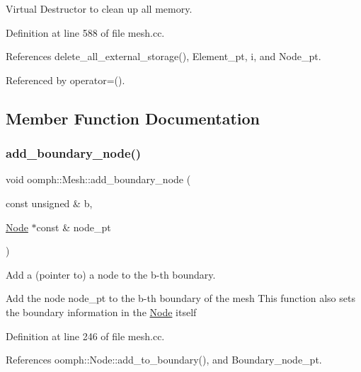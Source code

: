 Virtual Destructor to clean up all memory. 



Definition at line 588 of file mesh.\+cc.



References delete\+\_\+all\+\_\+external\+\_\+storage(), Element\+\_\+pt, i, and Node\+\_\+pt.



Referenced by operator=().



\subsection{Member Function Documentation}
\mbox{\label{classoomph_1_1Mesh_a007b102ac8e42328872ad658d7110bfc}} 
\subsubsection{\texorpdfstring{add\+\_\+boundary\+\_\+node()}{add\_boundary\_node()}}
{\footnotesize\ttfamily void oomph\+::\+Mesh\+::add\+\_\+boundary\+\_\+node (\begin{DoxyParamCaption}\item[{const unsigned \&}]{b,  }\item[{\hyperlink{classoomph_1_1Node}{Node} $\ast$const \&}]{node\+\_\+pt }\end{DoxyParamCaption})}



Add a (pointer to) a node to the b-\/th boundary. 

Add the node node\+\_\+pt to the b-\/th boundary of the mesh This function also sets the boundary information in the \hyperlink{classoomph_1_1Node}{Node} itself 

Definition at line 246 of file mesh.\+cc.



References oomph\+::\+Node\+::add\+\_\+to\+\_\+boundary(), and Boundary\+\_\+node\+\_\+pt.



